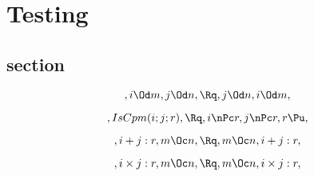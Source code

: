 \chapter{Testing}

\section{section}
\[,i \Od m, j \Od n, \Rq ,j \Od n, i \Od m,\]

\[,IsCpm(i;j;r), \Rq , i \nPc r, j \nPc r, r \Pu, \]

\[, i+j:r, m \Oc n, \Rq , m \Oc n, i+j:r,\]

\[, i \times j:r, m \Oc n, \Rq , m \Oc n, i \times j:r,\]
